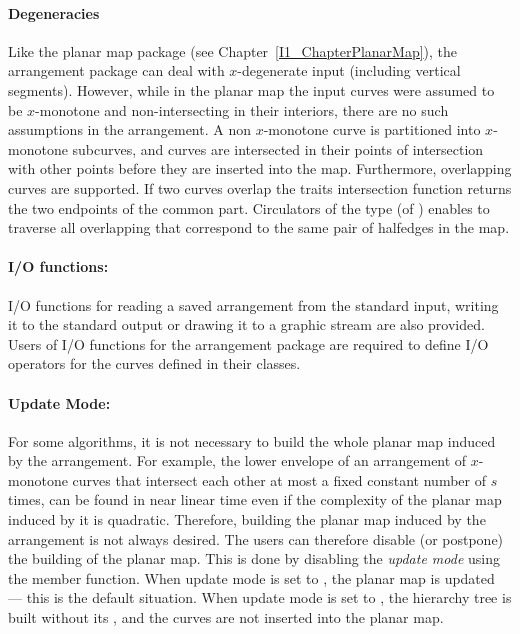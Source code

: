 \paragraph{Degeneracies} Like the planar map package (see
Chapter~\ref{I1_ChapterPlanarMap}), the arrangement package can deal
with $x$-degenerate input (including vertical segments). However,
while in the planar map the input curves were assumed to be
$x$-monotone and non-intersecting in their interiors, there are no
such assumptions in the arrangement. A non $x$-monotone curve is
partitioned into $x$-monotone subcurves, and curves are intersected in
their points of intersection with other points before they are
inserted into the map. Furthermore, overlapping curves are
supported. If two curves overlap the traits intersection function
returns the two endpoints of the common part. Circulators of the
 type (of
) enables to traverse all
overlapping  that correspond to the same pair of
halfedges in the map.

\paragraph{I/O functions:}
I/O functions for reading a saved arrangement from the standard input, 
writing it to the standard output or drawing it to a graphic stream are also provided.
Users of I/O functions for the arrangement package are required to define I/O 
operators for the curves defined in their  classes.

\paragraph{Update Mode:} For some algorithms, it is not necessary to build
the whole planar map induced by the arrangement. For example, the lower
envelope of an arrangement of $x$-monotone curves that intersect
each other at most a fixed constant number of $s$ times,
can be found in near linear time \cite{sa-dsstg-95, h-a-97}
even if
the complexity of the planar map induced by it is quadratic.
Therefore, building the planar map induced by the arrangement is not
always desired. The users can therefore disable (or postpone) the building
of the planar map. This is done by disabling the {\it update mode}
using the  member function. When update mode is
set to , the planar map is updated --- this is the
default situation. 
When update mode is set to , the hierarchy tree is built without
its , and the curves are not inserted into the planar map.

